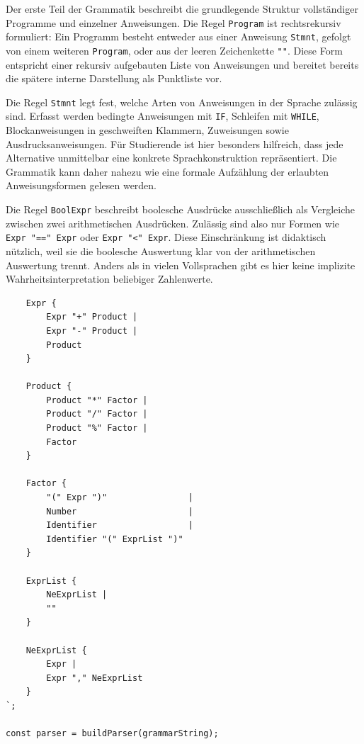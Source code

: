 Der erste Teil der Grammatik beschreibt die grundlegende Struktur vollständiger Programme und einzelner Anweisungen. Die Regel \texttt{Program} ist rechtsrekursiv formuliert: Ein Programm besteht entweder aus einer Anweisung \texttt{Stmnt}, gefolgt von einem weiteren \texttt{Program}, oder aus der leeren Zeichenkette \texttt{""}. Diese Form entspricht einer rekursiv aufgebauten Liste von Anweisungen und bereitet bereits die spätere interne Darstellung als Punktliste vor.

Die Regel \texttt{Stmnt} legt fest, welche Arten von Anweisungen in der Sprache zulässig sind. Erfasst werden bedingte Anweisungen mit \texttt{IF}, Schleifen mit \texttt{WHILE}, Blockanweisungen in geschweiften Klammern, Zuweisungen sowie Ausdrucksanweisungen. Für Studierende ist hier besonders hilfreich, dass jede Alternative unmittelbar eine konkrete Sprachkonstruktion repräsentiert. Die Grammatik kann daher nahezu wie eine formale Aufzählung der erlaubten Anweisungsformen gelesen werden.

Die Regel \texttt{BoolExpr} beschreibt boolesche Ausdrücke ausschließlich als Vergleiche zwischen zwei arithmetischen Ausdrücken. Zulässig sind also nur Formen wie \texttt{Expr "==" Expr} oder \texttt{Expr "<" Expr}. Diese Einschränkung ist didaktisch nützlich, weil sie die boolesche Auswertung klar von der arithmetischen Auswertung trennt. Anders als in vielen Vollsprachen gibt es hier keine implizite Wahrheitsinterpretation beliebiger Zahlenwerte.

\begin{listing}[htbp]
\caption{Ende der Lezer-Grammatik (Teil 2: Ausdrücke)}
\label{lst:lezer-grammar-2}
\begin{verbatim}
    Expr {
        Expr "+" Product |
        Expr "-" Product |
        Product
    }

    Product {
        Product "*" Factor |
        Product "/" Factor | 
        Product "%" Factor |
        Factor
    }

    Factor {
        "(" Expr ")"                |
        Number                      |
        Identifier                  |
        Identifier "(" ExprList ")"
    }

    ExprList {
        NeExprList | 
        ""
    }

    NeExprList {
        Expr |
        Expr "," NeExprList
    }
`;

const parser = buildParser(grammarString);
\end{verbatim}
\end{listing}

